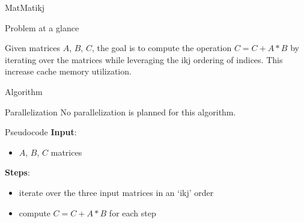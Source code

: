 \begin{chapter}{MatMatikj}
    \begin{section}{Problem at a glance}
        \par Given matrices $A$, $B$, $C$, the goal is to compute the  operation $C = C + A * B$ by iterating over the matrices while leveraging the ikj ordering of indices. This increase cache memory utilization.
    \end{section}
    \begin{section}{Algorithm}
        \begin{subsection}{Parallelization}
            No parallelization is planned for this algorithm.
        \end{subsection}
        \begin{subsection}{Pseudocode}
            \textbf{Input}:
            \begin{itemize}
                \item $A$, $B$, $C$ matrices
            \end{itemize}
            \textbf{Steps}:
            \begin{itemize}
                \item iterate over the three input matrices in an `ikj' order
                \item compute $C = C + A * B$ for each step
            \end{itemize}
            
        \end{subsection}
    \end{section}
\end{chapter}